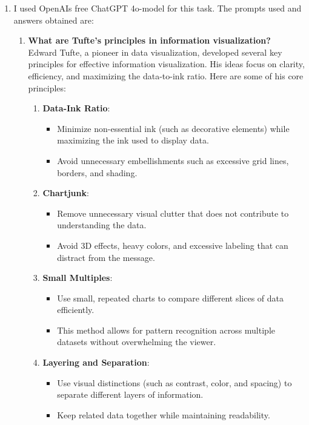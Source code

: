 \documentclass[11pt,a4paper,titlepage]{article}
\begin{document}
\begin{enumerate}
\begin{enumerate}
        \item I used OpenAIs free ChatGPT 4o-model for this task. The prompts used and answers obtained are:
        \begin{enumerate}
            \item \textbf{What are Tufte's principles in information visualization?} \\
            Edward Tufte, a pioneer in data visualization, developed several key principles for effective information visualization. His ideas focus on clarity, efficiency, and maximizing the data-to-ink ratio. Here are some of his core principles:
            \begin{enumerate}
    \item \textbf{Data-Ink Ratio}:
    \begin{itemize}
        \item Minimize non-essential ink (such as decorative elements) while maximizing the ink used to display data.
        \item Avoid unnecessary embellishments such as excessive grid lines, borders, and shading.
    \end{itemize}
    
    \item \textbf{Chartjunk}:
    \begin{itemize}
        \item Remove unnecessary visual clutter that does not contribute to understanding the data.
        \item Avoid 3D effects, heavy colors, and excessive labeling that can distract from the message.
    \end{itemize}
    
    \item \textbf{Small Multiples}:
    \begin{itemize}
        \item Use small, repeated charts to compare different slices of data efficiently.
        \item This method allows for pattern recognition across multiple datasets without overwhelming the viewer.
    \end{itemize}
    
    \item \textbf{Layering and Separation}:
    \begin{itemize}
        \item Use visual distinctions (such as contrast, color, and spacing) to separate different layers of information.
        \item Keep related data together while maintaining readability.
    \end{itemize}


\end{enumerate}
\end{enumerate}
\end{enumerate}
\end{enumerate}
\end{document}
